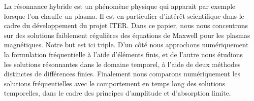 La r\'esonnance hybride est un ph\'enom\`ene physique qui apparait par exemple lorsque l'on chauffe un plasma.
Il est en particulier d'int\'er\^et scientifique dans le cadre du d\'eveloppement  du projet ITER. Dans ce papier, nous nous concentrons sur des solutions faiblement r\'eguli\`eres des \'equations de Maxwell pour les plasmas magn\'etiques. Notre but est ici triple. D'un c\^ot\'e nous 
approchons num\'eriquement la formulation fr\'equentielle \`a l'aide d'\'el\'ements finis,
 et de l'autre nous \'etudions les solutions r\'esonnantes dans le domaine temporel, \`a l'aide de deux m\'ethodes distinctes de diff\'erences finies. Finalement nous comparons  num\'eriquement les solutions fr\'equentielles avec le comportement en temps long des solutions temporelles, dans le cadre
des principes d'amplitude et d'absorption limite.

